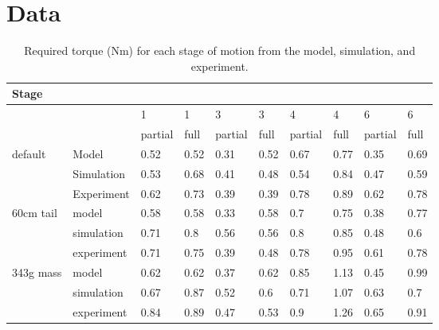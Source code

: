 \chapter{Data} \label{app:data}


\begin{table}[!ht]
	\centering
	\caption{Required torque (Nm) for each stage of motion from the model, simulation, and experiment.}
	\footnotesize
	\begin{tabular}{|l|l|l|l|l|l|l|l|l|l|}
		\hline
		Stage & ~ & ~ & ~ & ~ & ~ & ~ & ~ & ~ & ~ \\ \hline
		~ & ~ & 1 & 1 & 3 & 3 & 4 & 4 & 6 & 6 \\ \hline
		~ & ~ & partial & full & partial & full & partial & full & partial & full \\ \hline
		default & Model & 0.52 & 0.52 & 0.31 & 0.52 & 0.67 & 0.77 & 0.35 & 0.69 \\ \hline
		~ & Simulation & 0.53 & 0.68 & 0.41 & 0.48 & 0.54 & 0.84 & 0.47 & 0.59 \\ \hline
		~ & Experiment & 0.62 & 0.73 & 0.39 & 0.39 & 0.78 & 0.89 & 0.62 & 0.78 \\ \hline
		60cm tail & model & 0.58 & 0.58 & 0.33 & 0.58 & 0.7 & 0.75 & 0.38 & 0.77 \\ \hline
		~ & simulation & 0.71 & 0.8 & 0.56 & 0.56 & 0.8 & 0.85 & 0.48 & 0.6 \\ \hline
		~ & experiment & 0.71 & 0.75 & 0.39 & 0.48 & 0.78 & 0.95 & 0.61 & 0.78 \\ \hline
		343g mass & model & 0.62 & 0.62 & 0.37 & 0.62 & 0.85 & 1.13 & 0.45 & 0.99 \\ \hline
		~ & simulation & 0.67 & 0.87 & 0.52 & 0.6 & 0.71 & 1.07 & 0.63 & 0.7 \\ \hline
		~ & experiment & 0.84 & 0.89 & 0.47 & 0.53 & 0.9 & 1.26 & 0.65 & 0.91 \\ \hline
	\end{tabular}
\end{table}
